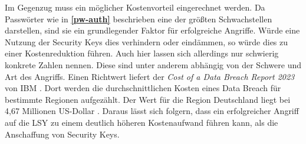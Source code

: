 Im Gegenzug muss ein möglicher Kostenvorteil eingerechnet werden. Da Passwörter wie in \textbf{\ref{pw-auth}} beschrieben eine der größten Schwachstellen darstellen, sind sie ein grundlegender Faktor für erfolgreiche Angriffe. Würde eine Nutzung der Security Keys dies verhindern oder eindämmen, so würde dies zu einer Kostenreduktion führen. Auch hier lassen sich allerdings nur schwierig konkrete Zahlen nennen. Diese sind unter anderem abhängig von der Schwere und Art des Angriffs. Einen Richtwert liefert der \textit{Cost of a Data Breach Report 2023} von IBM \cite{databreach}. Dort werden die durchschnittlichen Kosten eines Data Breach für bestimmte Regionen aufgezählt. Der Wert für die Region Deutschland liegt bei 4,67 Millionen US-Dollar \cite{databreach}. Daraus lässt sich folgern, dass ein erfolgreicher Angriff auf die \ac{LSY} zu einem deutlich höheren Kostenaufwand führen kann, als die Anschaffung von Security Keys.
